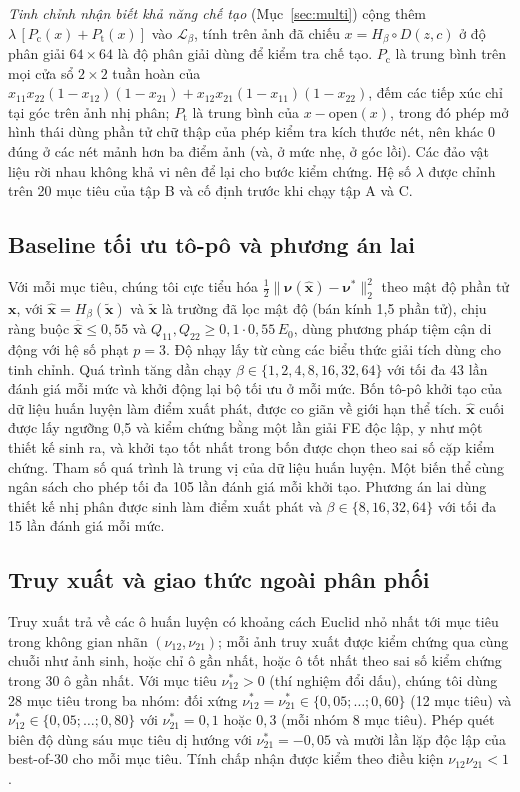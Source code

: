 \documentclass[a4paper,11pt]{article}
\newcommand{\nuot}{\nu_{12}}
\newcommand{\nuto}{\nu_{21}}
\begin{document}
\emph{Tinh chỉnh nhận biết khả năng chế tạo} (Mục~\ref{sec:multi}) cộng thêm
$\lambda\,[P_{\mathrm{c}}(x)+P_{\mathrm{t}}(x)]$ vào $\mathcal L_\beta$,
tính trên ảnh đã chiếu $x=H_\beta\circ D(z,c)$ ở độ phân giải $64\times64$
là độ phân giải dùng để kiểm tra chế tạo. $P_{\mathrm{c}}$ là trung bình trên
mọi cửa sổ $2\times2$ tuần hoàn của
$x_{11}x_{22}(1-x_{12})(1-x_{21})+x_{12}x_{21}(1-x_{11})(1-x_{22})$, đếm các
tiếp xúc chỉ tại góc trên ảnh nhị phân; $P_{\mathrm{t}}$ là trung bình của
$x-\mathrm{open}(x)$, trong đó phép mở hình thái dùng phần tử chữ thập của
phép kiểm tra kích thước nét, nên khác 0 đúng ở các nét mảnh hơn ba điểm ảnh
(và, ở mức nhẹ, ở góc lồi). Các đảo vật liệu rời nhau không khả vi nên để
lại cho bước kiểm chứng. Hệ số $\lambda$ được chỉnh trên 20 mục tiêu của tập
B và cố định trước khi chạy tập A và C.

\subsection{Baseline tối ưu tô-pô và phương án lai}
\label{sec:to}
Với mỗi mục tiêu, chúng tôi cực tiểu hóa
$\tfrac12\lVert\boldsymbol\nu(\hat{\mathbf x})-\boldsymbol\nu^{*}\rVert_2^2$
theo mật độ phần tử $\mathbf x$, với $\hat{\mathbf x}=H_\beta(\tilde{\mathbf x})$
và $\tilde{\mathbf x}$ là trường đã lọc mật độ (bán kính 1,5 phần tử), chịu
ràng buộc $\overline{\hat{\mathbf x}}\le0,55$ và
$Q_{11},Q_{22}\ge0,1\cdot0,55\,E_0$, dùng phương pháp tiệm cận di động
\citep{svanberg1987mma} với hệ số phạt $p=3$. Độ nhạy lấy từ cùng các biểu
thức giải tích dùng cho tinh chỉnh. Quá trình tăng dần chạy
$\beta\in\{1,2,4,8,16,32,64\}$ với tối đa 43 lần đánh giá mỗi mức và khởi
động lại bộ tối ưu ở mỗi mức. Bốn tô-pô khởi tạo của dữ liệu huấn luyện làm
điểm xuất phát, được co giãn về giới hạn thể tích. $\hat{\mathbf x}$ cuối
được lấy ngưỡng 0,5 và kiểm chứng bằng một lần giải FE độc lập, y như một
thiết kế sinh ra, và khởi tạo tốt nhất trong bốn được chọn theo sai số cặp
kiểm chứng. Tham số quá trình là trung vị của dữ liệu huấn luyện. Một biến
thể cùng ngân sách cho phép tối đa 105 lần đánh giá mỗi khởi tạo. Phương án
lai dùng thiết kế nhị phân được sinh làm điểm xuất phát và
$\beta\in\{8,16,32,64\}$ với tối đa 15 lần đánh giá mỗi mức.

\subsection{Truy xuất và giao thức ngoài phân phối}
Truy xuất trả về các ô huấn luyện có khoảng cách Euclid nhỏ nhất tới mục tiêu
trong không gian nhãn $(\nuot,\nuto)$; mỗi ảnh truy xuất được kiểm chứng qua
cùng chuỗi như ảnh sinh, hoặc chỉ ô gần nhất, hoặc ô tốt nhất theo sai số
kiểm chứng trong 30 ô gần nhất. Với mục tiêu $\nuot^{*}>0$ (thí nghiệm đổi
dấu), chúng tôi dùng 28 mục tiêu trong ba nhóm: đối xứng
$\nuot^{*}=\nuto^{*}\in\{0,05;\dots;0,60\}$ (12 mục tiêu) và
$\nuot^{*}\in\{0,05;\dots;0,80\}$ với $\nuto^{*}=0,1$ hoặc $0,3$ (mỗi nhóm 8
mục tiêu). Phép quét biên độ dùng sáu mục tiêu dị hướng với
$\nuto^{*}=-0,05$ và mười lần lặp độc lập của best-of-30 cho mỗi mục tiêu.
Tính chấp nhận được kiểm theo điều kiện $\nuot\nuto<1$
\citep{lempriere1968poisson}.
\end{document}
